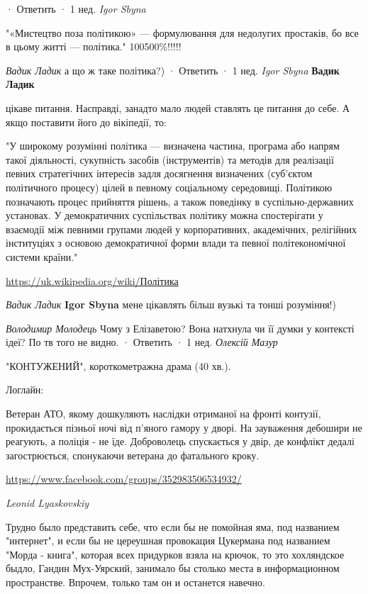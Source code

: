 \begin{itemize}
 · Ответить · 1 нед.
\emph{Igor Sbyna}

"«Мистецтво поза політикою» — формулювання для недолугих простаків, бо все в
цьому житті — політика." 100500\%!!!!!

\begin{itemize}
\emph{Вадик Ладик}
а що ж таке політика?)
 · Ответить · 1 нед.
\emph{Igor Sbyna}
\textbf{Вадик Ладик} 

цікаве питання. Насправді, занадто мало людей ставлять це питання до себе. А
якщо поставити його до вікіпедії, то:

"У широкому розумінні політика — визначена частина, програма або напрям такої
діяльності, сукупність засобів (інструментів) та методів для реалізації певних
стратегічних інтересів задля досягнення визначених (суб'єктом політичного
процесу) цілей в певному соціальному середовищі. Політикою позначають процес
прийняття рішень, а також поведінку в суспільно-державних установах. У
демократичних суспільствах політику можна спостерігати у взаємодії між певними
групами людей у корпоративних, академічних, релігійних інституціях з основою
демократичної форми влади та певної політекономічної системи країни."

\url{https://uk.wikipedia.org/wiki/Політика}

\emph{Вадик Ладик}
\textbf{Igor Sbyna} мене цікавлять більш вузькі та тонші розуміння!)

\end{itemize}

\emph{Володимир Молодець}
Чому з Елізаветою? Вона натхнула чи її думки у контексті ідеї? По тв того не видно.
 · Ответить · 1 нед.
\emph{Олексій Мазур}

"КОНТУЖЕНИЙ", короткометражна драма (40 хв.).

Логлайн:

Ветеран АТО, якому дошкуляють наслідки отриманої на фронті контузії,
прокидається пізньої ночі від п'яного гамору у дворі. На зауваження дебошири не
реагують, а поліція - не їде. Доброволець спускається у двір, де конфлікт
дедалі загострюється, спонукаючи ветерана до фатального кроку.

\url{https://www.facebook.com/groups/352983506534932/}

\emph{Leonid Lyaskovskiy}

Трудно было представить себе, что если бы не помойная яма, под названием
"интернет", и если бы не цереушная провокация Цукермана под названием "Морда -
книга", которая всех придурков взяла на крючок, то это хохляндское быдло,
Гандин Мух-Уярский, занимало бы столько места в информационном пространстве.
Впрочем, только там он и останется навечно.


\end{itemize}
